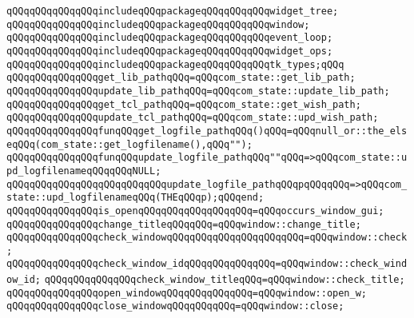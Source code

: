 \verb|qQQqqQQqqQQqqQQqincludeqQQqpackageqQQqqQQqqQQqwidget_tree;|\newline
\verb|qQQqqQQqqQQqqQQqincludeqQQqpackageqQQqqQQqqQQqwindow;|\newline
\verb|qQQqqQQqqQQqqQQqincludeqQQqpackageqQQqqQQqqQQqevent_loop;|\newline
\verb|qQQqqQQqqQQqqQQqincludeqQQqpackageqQQqqQQqqQQqwidget_ops;|\newline
\verb|qQQqqQQqqQQqqQQqincludeqQQqpackageqQQqqQQqqQQqtk_types;qQQq|\newline
\newline
\verb|qQQqqQQqqQQqqQQqget_lib_pathqQQq=qQQqcom_state::get_lib_path;|\newline
\verb|qQQqqQQqqQQqqQQqupdate_lib_pathqQQq=qQQqcom_state::update_lib_path;|\newline
\newline
\verb|qQQqqQQqqQQqqQQqget_tcl_pathqQQq=qQQqcom_state::get_wish_path;|\newline
\verb|qQQqqQQqqQQqqQQqupdate_tcl_pathqQQq=qQQqcom_state::upd_wish_path;|\newline
\newline
\verb|qQQqqQQqqQQqqQQqfunqQQqget_logfile_pathqQQq()qQQq=qQQqnull_or::the_elseqQQq(com_state::get_logfilename(),qQQq"");|\newline
\verb|qQQqqQQqqQQqqQQqfunqQQqupdate_logfile_pathqQQq""qQQq=>qQQqcom_state::upd_logfilenameqQQqqQQqNULL;|\newline
\verb|qQQqqQQqqQQqqQQqqQQqqQQqqQQqupdate_logfile_pathqQQqpqQQqqQQq=>qQQqcom_state::upd_logfilenameqQQq(THEqQQqp);qQQqend;|\newline
\newline
\verb|qQQqqQQqqQQqqQQqis_openqQQqqQQqqQQqqQQqqQQq=qQQqoccurs_window_gui;|\newline
\newline
\verb|qQQqqQQqqQQqqQQqchange_titleqQQqqQQq=qQQqwindow::change_title;|\newline
\verb|qQQqqQQqqQQqqQQqcheck_windowqQQqqQQqqQQqqQQqqQQqqQQq=qQQqwindow::check;|\newline
\verb|qQQqqQQqqQQqqQQqcheck_window_idqQQqqQQqqQQqqQQq=qQQqwindow::check_window_id;|\newline
\verb|qQQqqQQqqQQqqQQqcheck_window_titleqQQq=qQQqwindow::check_title;|\newline
\verb|qQQqqQQqqQQqqQQqopen_windowqQQqqQQqqQQqqQQq=qQQqwindow::open_w;|\newline
\verb|qQQqqQQqqQQqqQQqclose_windowqQQqqQQqqQQq=qQQqwindow::close;|\newline
